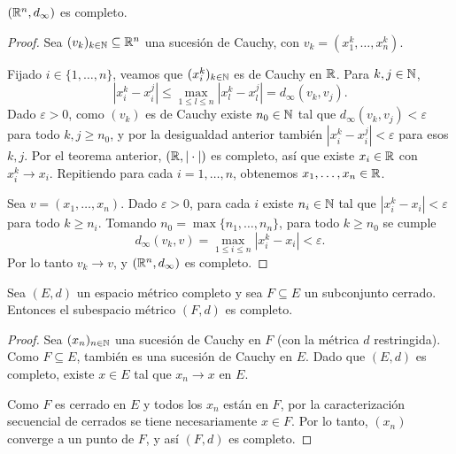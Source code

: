 \begin{cor}
$(\mathbb{R}^n, d_\infty)$ es completo.
\end{cor}

\begin{proof}
Sea $(v_k)_{k\in\mathbb{N}} \subseteq \mathbb{R}^n$ una sucesión de Cauchy, con
$v_k = (x_1^k, \dots, x_n^k)$.

Fijado $i \in \{1,\dots,n\}$, veamos que $(x_i^k)_{k\in\mathbb{N}}$ es de Cauchy en
$\mathbb{R}$. Para $k,j \in \mathbb{N}$,
\[
|x_i^k - x_i^j| \le \max_{1\le l \le n} |x_l^k - x_l^j| = d_\infty(v_k,v_j).
\]
Dado $\varepsilon>0$, como $(v_k)$ es de Cauchy existe $n_0 \in \mathbb{N}$ tal que
$d_\infty(v_k,v_j) < \varepsilon$ para todo $k,j \ge n_0$, y por la
desigualdad anterior también $|x_i^k - x_i^j| < \varepsilon$ para esos
$k,j$. Por el teorema anterior, $(\mathbb{R},|\cdot|)$ es completo, así que existe
$x_i \in \mathbb{R}$ con $x_i^k \to x_i$. Repitiendo para cada $i=1,\dots,n$,
obtenemos $x_1,\dots,x_n \in \mathbb{R}$.

Sea $v=(x_1,\dots,x_n)$. Dado $\varepsilon>0$, para cada $i$ existe $n_i \in
\mathbb{N}$ tal que $|x_i^k - x_i| < \varepsilon$ para todo $k \ge n_i$. Tomando
$n_0 = \max\{n_1,\dots,n_n\}$, para todo $k \ge n_0$ se cumple
\[
d_\infty(v_k, v) = \max_{1\le i \le n} |x_i^k - x_i| < \varepsilon.
\]
Por lo tanto $v_k \to v$, y $(\mathbb{R}^n, d_\infty)$ es completo.
\end{proof}

\begin{prop}
Sea $(E,d)$ un espacio métrico completo y sea $F \subseteq E$ un subconjunto
cerrado. Entonces el subespacio métrico $(F,d)$ es completo.
\end{prop}

\begin{proof}
Sea $(x_n)_{n\in\mathbb{N}}$ una sucesión de Cauchy en $F$ (con la métrica $d$
restringida). Como $F \subseteq E$, también es una sucesión de Cauchy en $E$.
Dado que $(E,d)$ es completo, existe $x \in E$ tal que $x_n \to x$ en $E$.

Como $F$ es cerrado en $E$ y todos los $x_n$ están en $F$, por la
caracterización secuencial de cerrados se tiene necesariamente $x \in F$.
Por lo tanto, $(x_n)$ converge a un punto de $F$, y así $(F,d)$ es completo.
\end{proof}
